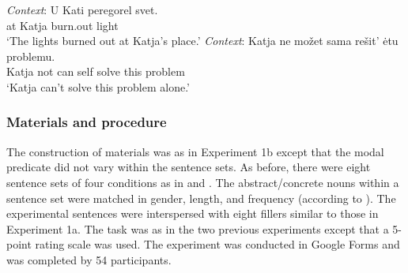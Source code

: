 \documentclass[output=paper]{langscibook}
\begin{document}
\ea \gll \textit{Context}: U Kati peregorel svet. \label{materials-exp2-anim}\\
{} at Katja burn.out light\\
\glt \hspace{1.3cm} `The lights burned out at Katja's place.'
\z \ex \gll \textit{Context}: Katja ne možet sama rešit' ėtu problemu. \label{materials-exp2-inan}\\
{} Katja not can self solve this problem\\
\glt \hspace{1.3cm} `Katja can't solve this problem alone.'
\z\z

\subsubsection{Materials and procedure}

 The construction of materials was as in Experiment 1b except that the modal predicate did not vary within the sentence sets. As before, there were eight sentence sets of four conditions as in  and . The abstract/concrete nouns within a sentence set were matched in gender, length, and frequency (according to \citealt{Ljasevskaja.Sarov2009}). The experimental sentences were interspersed with eight fillers similar to those in Experiment 1a. The task was as in the two previous experiments except that a 5-point rating scale was used. The experiment was conducted in Google Forms and was completed by 54 participants.
\end{document}
